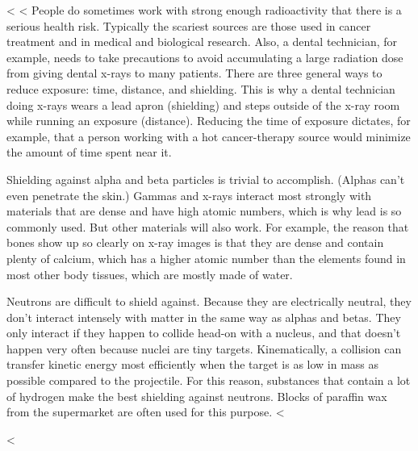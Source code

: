 <%
<%
People do sometimes work with strong enough radioactivity that there is a serious health risk.
Typically the scariest sources are those used in cancer treatment and in medical and biological
research. Also, a dental technician, for example, needs to take precautions to avoid accumulating
a large radiation dose from giving dental x-rays to many patients. There are three general ways to
reduce exposure: time, distance, and shielding. This is why a dental technician doing x-rays wears
a lead apron (shielding) and steps outside of the x-ray room while running an exposure (distance).
Reducing the time of exposure dictates, for example, that a person working with a hot cancer-therapy
source would minimize the amount of time spent near it.

Shielding against alpha and beta particles
is trivial to accomplish. (Alphas can't even penetrate the skin.) Gammas and x-rays interact most
strongly with materials that are dense and have high atomic numbers, which is why lead is so
commonly used. But other materials will also work. For example, the reason that bones show up
so clearly on x-ray images is that they are dense and contain plenty of calcium, which has a higher
atomic number than the elements found in most other body tissues, which are mostly made of water.

Neutrons are difficult to shield
against. Because they are electrically neutral, they don't interact intensely with matter in the same
way as alphas and betas. They only interact if they happen to collide head-on with a nucleus, and
that doesn't happen very often because nuclei are tiny targets. Kinematically, a collision can transfer
kinetic energy most efficiently when the target is as low in mass as possible compared to the projectile.
For this reason, substances that contain a lot of hydrogen make the best shielding against neutrons.
Blocks of paraffin wax from the supermarket are often used for this purpose.
<%

<%
